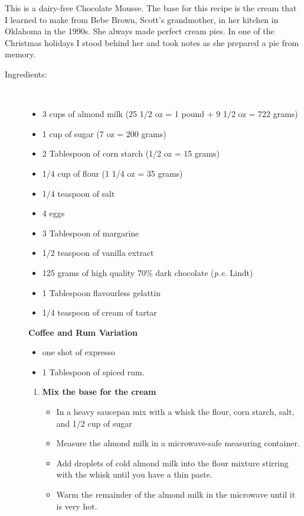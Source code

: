\documentclass[11pt,letterpaper]{article}
\begin{document}



This is a dairy-free Chocolate Mousse. The base for this recipe is the cream that I learned to make from Bebe Brown, Scott's grandmother, in her kitchen in Oklahoma in the 1990s. She always made perfect cream pies. In one of the Christmas holidays I stood behind her and took notes as she prepared a pie from memory. 
	
\begin{description}
\item[Ingredients:]\ \\
	\begin{itemize}
	\item 3 cups of almond milk (25 1/2 oz = 1 pound + 9 1/2 oz = 722 grams)
	\item 1 cup of sugar (7 oz = 200 grams)
	\item 2 Tablespoon of corn starch (1/2 oz = 15 grams)
	\item 1/4 cup of flour (1 1/4 oz = 35 grams)
	\item 1/4 teaspoon of salt
	\item 4 eggs
	\item 3 Tablespoon of margarine
	\item 1/2 teaspoon of vanilla extract
	\item 125 grams of high quality 70\% dark chocolate ({\it p.e.} Lindt)
	\item 1 Tablespoon flavourless gelattin
	\item 1/4 teaspoon of cream of tartar
	\end{itemize}
	
	{\bf Coffee and Rum Variation}
	\begin{itemize}
	\item one shot of expresso
	\item 1 Tablespoon of spiced rum.
	\end{itemize}

	\begin{enumerate}
	\item {\bf Mix the base for the cream}
		\begin{itemize}
		\item In a heavy saucepan mix with a whisk the flour, corn starch, salt, and 1/2 cup of sugar
		\item Measure the almond milk in a microwave-safe measuring container.
		\item Add droplets of cold almond milk into the flour mixture stirring with the whisk until you have a thin paste.
		\item Warm the remainder of the almond milk in the microwave until it is very hot.
		\end{itemize}


\end{enumerate}
\end{description}
\end{document}
